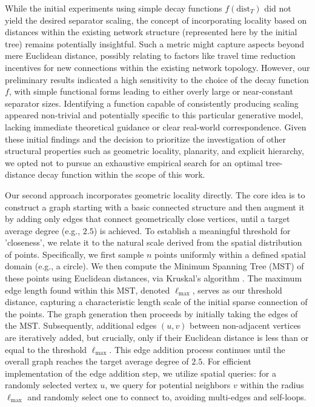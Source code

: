 While the initial experiments using simple decay functions \(f(\text{dist}_T)\) did not yield the desired separator scaling, the concept of incorporating locality based on distances within the existing network structure (represented here by the initial tree) remains potentially insightful.
Such a metric might capture aspects beyond mere Euclidean distance, possibly relating to factors like travel time reduction incentives for new connections within the existing network topology.
However, our preliminary results indicated a high sensitivity to the choice of the decay function \(f\), with simple functional forms leading to either overly large or near-constant separator sizes.
Identifying a function capable of consistently producing  scaling appeared non-trivial and potentially specific to this particular generative model, lacking immediate theoretical guidance or clear real-world correspondence.
Given these initial findings and the decision to prioritize the investigation of other structural properties such as geometric locality, planarity, and explicit hierarchy, we opted not to pursue an exhaustive empirical search for an optimal tree-distance decay function within the scope of this work.

Our second approach incorporates geometric locality directly.
The core idea is to construct a graph starting with a basic connected structure and then augment it by adding only edges that connect geometrically close vertices, until a target average degree (e.g., \(2.5\)) is achieved.
To establish a meaningful threshold for 'closeness', we relate it to the natural scale derived from the spatial distribution of points.
Specifically, we first sample \(n\) points uniformly within a defined spatial domain (e.g., a circle).
We then compute the Minimum Spanning Tree (MST) of these points using Euclidean distances, via Kruskal's algorithm \cite{kruskal_shortest_1956}.
The maximum edge length found within this MST, denoted \(\ell_{\max}\), serves as our threshold distance, capturing a characteristic length scale of the initial sparse connection of the points.
The graph generation then proceeds by initially taking the edges of the MST.
Subsequently, additional edges \((u, v)\) between non-adjacent vertices are iteratively added, but crucially, only if their Euclidean distance is less than or equal to the threshold \(\ell_{\max}\).
This edge addition process continues until the overall graph reaches the target average degree of \(2.5\).
For efficient implementation of the edge addition step, we utilize spatial queries: for a randomly selected vertex \(u\), we query for potential neighbors \(v\) within the radius \(\ell_{\max}\) and randomly select one to connect to, avoiding multi-edges and self-loops.

